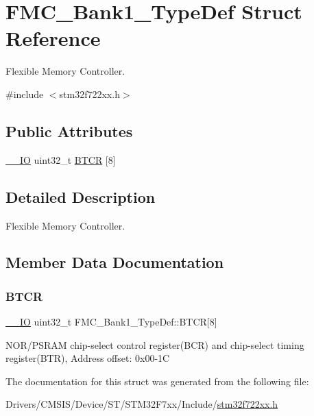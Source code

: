 \hypertarget{struct_f_m_c___bank1___type_def}{}\section{F\+M\+C\+\_\+\+Bank1\+\_\+\+Type\+Def Struct Reference}
\label{struct_f_m_c___bank1___type_def}


Flexible Memory Controller.  




{\ttfamily \#include $<$stm32f722xx.\+h$>$}

\subsection*{Public Attributes}
\begin{DoxyCompactItemize}
\item 
\mbox{\hyperlink{core__sc300_8h_aec43007d9998a0a0e01faede4133d6be}{\+\_\+\+\_\+\+IO}} uint32\+\_\+t \mbox{\hyperlink{struct_f_m_c___bank1___type_def_a161ea3265a8e17e5c7ef12f7ea19ff52}{B\+T\+CR}} \mbox{[}8\mbox{]}
\end{DoxyCompactItemize}


\subsection{Detailed Description}
Flexible Memory Controller. 

\subsection{Member Data Documentation}
\mbox{\label{struct_f_m_c___bank1___type_def_a161ea3265a8e17e5c7ef12f7ea19ff52}} 
\subsubsection{\texorpdfstring{BTCR}{BTCR}}
{\footnotesize\ttfamily \mbox{\hyperlink{core__sc300_8h_aec43007d9998a0a0e01faede4133d6be}{\+\_\+\+\_\+\+IO}} uint32\+\_\+t F\+M\+C\+\_\+\+Bank1\+\_\+\+Type\+Def\+::\+B\+T\+CR\mbox{[}8\mbox{]}}

N\+O\+R/\+P\+S\+R\+AM chip-\/select control register(\+B\+C\+R) and chip-\/select timing register(\+B\+T\+R), Address offset\+: 0x00-\/1C 

The documentation for this struct was generated from the following file\+:\begin{DoxyCompactItemize}
\item 
Drivers/\+C\+M\+S\+I\+S/\+Device/\+S\+T/\+S\+T\+M32\+F7xx/\+Include/\mbox{\hyperlink{stm32f722xx_8h}{stm32f722xx.\+h}}\end{DoxyCompactItemize}
